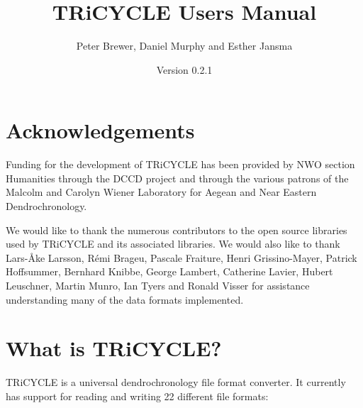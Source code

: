 \documentclass[10pt, headsepline,DIV14,BCOR0.5cm]{scrreprt}
\title{TRiCYCLE Users Manual}
\author{Peter Brewer, Daniel Murphy and Esther Jansma}
\date{Version 0.2.1}
\begin{document}
\maketitle
{}
\setcounter{page}{1}

\tableofcontents


\chapter{Acknowledgements}
\setcounter{page}{1}

Funding for the development of TRiCYCLE has been provided by NWO section Humanities through the
DCCD project and through the various patrons of the Malcolm and Carolyn Wiener Laboratory for Aegean
and Near Eastern Dendrochronology.

We would like to thank the numerous contributors to the open source libraries used by TRiCYCLE and
its associated libraries. We would also like to thank Lars-Åke Larsson, Rémi Brageu, Pascale Fraiture,
Henri Grissino-Mayer, Patrick Hoffsummer, Bernhard Knibbe, George Lambert, Catherine Lavier, Hubert
Leuschner, Martin Munro, Ian Tyers and Ronald Visser for assistance understanding many of the data
formats implemented.

\chapter{What is TRiCYCLE?}

TRiCYCLE is a universal dendrochronology file format converter. It currently has support for reading and
writing 22 different file formats:
\end{document}
